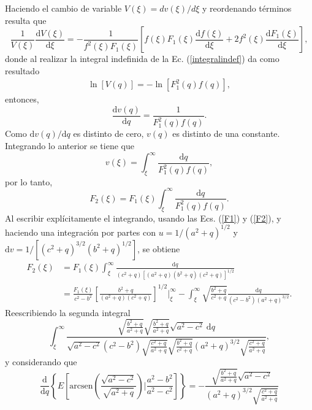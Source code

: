 Haciendo el cambio de variable $V(\xi)=dv(\xi)/d\xi$ y reordenando términos resulta que
\begin{equation}
    \frac{1}{V(\xi)}\frac{\text{d}V(\xi)}{\text{d}\xi}=-\frac{1}{f^2(\xi)F_1(\xi)}\left[f(\xi)F_1(\xi)\frac{\text{d}f(\xi)}{\text{d}\xi}+2f^2(\xi)\frac{\text{d}F_1(\xi)}{\text{d}\xi}\right],
    \label{integralindef}
\end{equation}
donde al realizar la integral indefinida de la Ec. (\ref{integralindef}) da como resultado
\begin{align*}
    \ln[V(q)]=-\ln[F_1^2(q)f(q)],
\end{align*}
entonces,
\begin{equation*}
    \frac{\text{d}v(q)}{\text{d}q}=\frac{1}{F_1^2(q)f(q)}.
\end{equation*}
Como $\text{d}v(q)/\text{d}q$ es distinto de cero,  $v(q)$ es distinto de una constante. Integrando lo anterior se tiene que
\begin{equation*}
    v(\xi)=\int_{\xi}^{\infty}\frac{\text{d}q}{F_1^2(q)f(q)},
\end{equation*}
por lo tanto, 
\begin{equation}
  F_2(\xi)=F_1(\xi)\int_{\xi}^{\infty}\frac{\text{d}q}{F_1^2(q)f(q)}.
  \label{F2}
\end{equation}
Al escribir explícitamente el integrando, usando las Ecs. (\ref{F1}) y (\ref{F2}), y haciendo una integración por partes con $u=1/(a^2+q)^{1/2}$ y $\text{d}v=1/[(c^2+q)^{3/2}(b^2+q)^{1/2}]$, se obtiene
\begin{align}
    F_2(\xi)&=F_1(\xi)\int_{\xi}^{\infty}\frac{\text{d}q}{(c^2+q)[(a^2+q)(b^2+q)(c^2+q)]^{1/2}}\nonumber\\
    &=\frac{F_1(\xi)}{c^2-b^2}\left[\frac{b^2+q}{(a^2+q)(c^2+q)}\right]^{1/2}\Bigg|_\xi^{\infty}-\int_\xi^{\infty}\sqrt{\frac{b^2+q}{c^2+q}}\frac{\text{d}q}{(c^2-b^2)(a^2+q)^{3/2}}.
\end{align}
Reescribiendo la segunda integral
\begin{equation}
	\int_\xi^{\infty}\frac{\sqrt{\frac{b^2+q}{a^2+q}}\sqrt{\frac{b^2+q}{a^2+q}}\sqrt{a^2-c^2}\:\text{d}q}{\sqrt{a^2-c^2}(c^2-b^2)\sqrt{\frac{c^2+q}{a^2+q}}\sqrt{\frac{b^2+q}{c^2+q}}(a^2+q)^{3/2}\sqrt{\frac{c^2+q}{a^2+q}}},\label{eliptic}
\end{equation}
y considerando que
\begin{equation*}
	\frac{\text{d}}{\text{d}q}\left\{E\left[\mbox{arcsen}\left(\frac{\sqrt{a^2-c^2}}{\sqrt{a^2+q}}\right)\Bigg|\frac{a^2-b^2}{a^2-c^2}\right]\right\}=-\frac{\sqrt{\frac{b^2+q}{a^2+q}}\sqrt{a^2-c^2}}{(a^2+q)^{3/2}\sqrt{\frac{c^2+q}{a^2+q}}}
\end{equation*}
